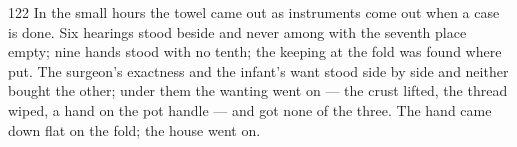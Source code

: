 \begin{CRchronicle}{122}
In the small hours the towel came out as instruments come out when a case is done. Six hearings stood beside and never among with the seventh place empty; nine hands stood with no tenth; the keeping at the fold was found where put. The surgeon’s exactness and the infant’s want stood side by side and neither bought the other; under them the wanting went on — the crust lifted, the thread wiped, a hand on the pot handle — and got none of the three. The hand came down flat on the fold; the house went on.
\end{CRchronicle}
